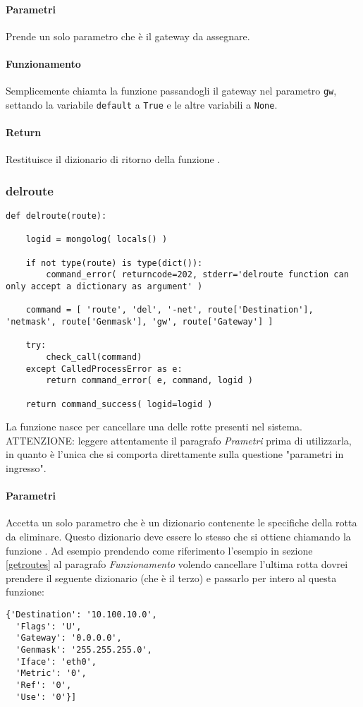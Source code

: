 \documentclass[11pt]{article}
\begin{document}
\paragraph{Parametri}
Prende un solo parametro che è il gateway da assegnare.
\paragraph{Funzionamento}
Semplicemente chiamta la funzione  passandogli il gateway nel parametro \texttt{gw}, settando
la variabile \texttt{default} a \texttt{True} e le altre variabili a \texttt{None}.
\paragraph{Return}
Restituisce il dizionario di ritorno della funzione .

\subsubsection{delroute}\label{delroute}
\begin{lstlisting}
def delroute(route):

    logid = mongolog( locals() )

    if not type(route) is type(dict()):
        command_error( returncode=202, stderr='delroute function can only accept a dictionary as argument' )

    command = [ 'route', 'del', '-net', route['Destination'], 'netmask', route['Genmask'], 'gw', route['Gateway'] ]

    try:
        check_call(command)
    except CalledProcessError as e:
        return command_error( e, command, logid )

    return command_success( logid=logid )
\end{lstlisting}
La funzione nasce per cancellare una delle rotte presenti nel sistema.\\
ATTENZIONE: leggere attentamente il paragrafo \textit{Prametri} prima di utilizzarla, in quanto è l'unica
che si comporta direttamente sulla questione "parametri in ingresso".
\paragraph{Parametri}
Accetta un solo parametro che è un dizionario contenente le specifiche della rotta da eliminare. Questo dizionario deve
essere lo stesso che si ottiene chiamando la funzione . Ad esempio prendendo come riferimento l'esempio
in sezione \ref{getroutes} al paragrafo \textit{Funzionamento} volendo cancellare l'ultima rotta dovrei prendere il seguente
dizionario (che è il terzo) e passarlo per intero al questa funzione:
\begin{lstlisting}
{'Destination': '10.100.10.0',
  'Flags': 'U',
  'Gateway': '0.0.0.0',
  'Genmask': '255.255.255.0',
  'Iface': 'eth0',
  'Metric': '0',
  'Ref': '0',
  'Use': '0'}]
\end{lstlisting}
\end{document}
